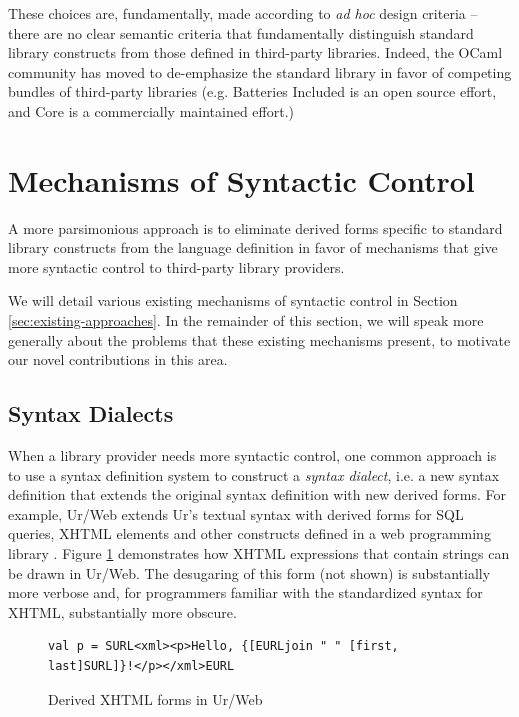 These choices are, fundamentally, made according to \emph{ad hoc} design criteria -- there are no clear semantic criteria that fundamentally distinguish standard library constructs from  those defined in third-party libraries. 
Indeed, the OCaml community has  moved to de-emphasize the standard library in favor of competing bundles of third-party libraries (e.g. Batteries Included \cite{OCaml-batteries} is an open source effort, and Core \cite{OCaml-core} is a commercially maintained effort.)

\section{Mechanisms of Syntactic Control}
A more parsimonious approach is to eliminate derived forms  specific to standard library constructs from the language definition in favor of mechanisms that give more syntactic control to third-party library providers.

We will detail various existing mechanisms of syntactic control in Section \ref{sec:existing-approaches}. In the remainder of this section, we will speak more generally about the problems that these existing mechanisms present, to motivate our novel contributions in this area.


\subsection{Syntax Dialects}\label{sec:problems-with-dialects}
When a library provider needs more syntactic control, one common approach is to use a syntax definition system to construct a \emph{syntax dialect}, i.e. a new syntax definition that extends the original syntax definition with new derived forms. 
 For example, Ur/Web extends Ur's textual syntax with derived forms for SQL queries, XHTML elements and other constructs defined in a  web programming library \cite{conf/popl/Chlipala15}. Figure \ref{fig:urweb} demonstrates how XHTML expressions that contain strings can be drawn in Ur/Web. The desugaring of this form (not shown) is substantially more verbose and, for programmers familiar with the standardized syntax for XHTML, substantially more obscure. %
\begin{figure}
\begin{lstlisting}[numbers=none]
val p = SURL<xml><p>Hello, {[EURLjoin " " [first, last]SURL]}!</p></xml>EURL
\end{lstlisting}
\caption{Derived XHTML forms in Ur/Web}
\label{fig:urweb}
\end{figure}                           

